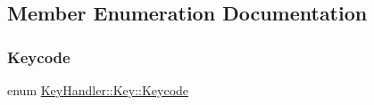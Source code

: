 \subsection{Member Enumeration Documentation}
\hypertarget{class_key_handler_1_1_key_a832541e186986ff9f6bd5a810ed5c164}{}\label{class_key_handler_1_1_key_a832541e186986ff9f6bd5a810ed5c164} 
\subsubsection{\texorpdfstring{Keycode}{Keycode}}
{\footnotesize\ttfamily enum \hyperlink{class_key_handler_1_1_key_a832541e186986ff9f6bd5a810ed5c164}{Key\+Handler\+::\+Key\+::\+Keycode}}

